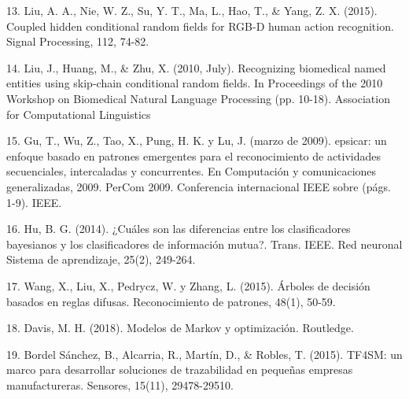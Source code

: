 \documentclass{paper}
\begin{document}
\bigskip
\bigskip


13. Liu, A. A., Nie, W. Z., Su, Y. T., Ma, L., Hao, T., & Yang, Z. X. (2015). Coupled hidden conditional random fields for RGB-D human action recognition. Signal Processing, 112, 74-82.

\bigskip
\bigskip


14. Liu, J., Huang, M., & Zhu, X. (2010, July). Recognizing biomedical named entities using skip-chain conditional random fields. In Proceedings of the 2010 Workshop on
Biomedical Natural Language Processing (pp. 10-18). Association for Computational Linguistics

\bigskip
\bigskip



15. Gu, T., Wu, Z., Tao, X., Pung, H. K. y Lu, J. (marzo de 2009). epsicar: un enfoque basado en patrones emergentes para el reconocimiento de actividades secuenciales, intercaladas y concurrentes. En
Computación y comunicaciones generalizadas, 2009. PerCom 2009. Conferencia internacional IEEE sobre (págs. 1-9). IEEE.

\bigskip
\bigskip


16. Hu, B. G. (2014). ¿Cuáles son las diferencias entre los clasificadores bayesianos y los clasificadores de información mutua?. Trans. IEEE. Red neuronal Sistema de aprendizaje, 25(2), 249-264.

\bigskip
\bigskip

17. Wang, X., Liu, X., Pedrycz, W. y Zhang, L. (2015). Árboles de decisión basados en reglas difusas. Reconocimiento de patrones, 48(1), 50-59.

\bigskip
\bigskip

18. Davis, M. H. (2018). Modelos de Markov y optimización. Routledge.

\bigskip
\bigskip

19. Bordel Sánchez, B., Alcarria, R., Martín, D., & Robles, T. (2015). TF4SM: un marco para desarrollar soluciones de trazabilidad en pequeñas empresas manufactureras. Sensores, 15(11), 29478-29510.
\end{document}
